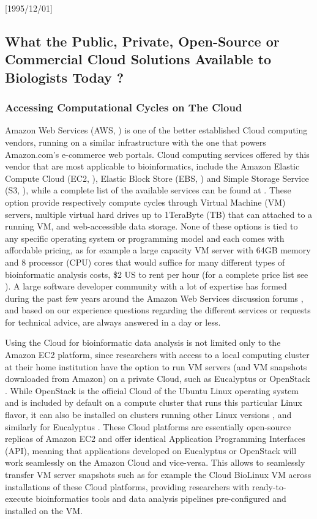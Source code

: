 \NeedsTeXFormat{LaTeX2e}[1995/12/01] \documentclass[10pt]{bmc_article}
\newenvironment{bmcformat}{\begin{raggedright}\baselineskip20pt\sloppy\setboolean{publ}{false}}{\end{raggedright}\baselineskip20pt\sloppy}
\begin{document}
\begin{bmcformat}
\subsection*{What the Public, Private, Open-Source or Commercial Cloud Solutions Available to Biologists Today ?} 

\subsubsection*{Accessing Computational Cycles on The Cloud}

Amazon Web Services (AWS, \cite{aws}) is one of the better established Cloud computing vendors, running on a
similar infrastructure with the one that powers Amazon.com's e-commerce web portals. Cloud computing services 
offered by this vendor that are most applicable to bioinformatics, include the Amazon Elastic Compute Cloud (EC2, \cite{awsec2}),  
Elastic Block Store (EBS, \cite{ebs}) and Simple Storage Service (S3, \cite{s3}), while a complete list of the available 
services can be found at \cite{aws}. These option provide respectively compute cycles through Virtual Machine (VM) 
servers, multiple virtual hard drives up to 1TeraByte (TB) that can attached to a running VM,  and web-accessible 
data storage. None of these options is tied to any specific operating system or programming model and each comes  
with affordable pricing, as for example a large capacity VM server with 64GB memory and 8 processor (CPU) cores 
that would suffice for many different types of bioinformatic analysis costs, \$2 US to rent per hour (for a complete price
 list see \cite{ec2price}). A large software developer community with a lot of expertise has formed during the past few 
 years around the Amazon Web Services discussion forums \cite{awsforums}, and based on our experience questions 
 regarding the  different services or requests for technical advice, are always answered in a day or less. \pb

Using the Cloud for bioinformatic data analysis is not limited only to the Amazon EC2 platform, since researchers
with access to a local computing cluster at their home institution have the option to run VM servers (and VM
snapshots downloaded from Amazon) on a private Cloud, such as Eucalyptus \cite{euca} or OpenStack \cite{openstack}. 
While OpenStack is the official Cloud of the Ubuntu Linux operating system \cite{ubuntucloud} and is included 
by default on a compute cluster that runs this particular Linux flavor, it can also be installed on clusters running other 
Linux versions \cite{openstackother}, and similarly for Eucalyptus \cite{eucalyptusother}. These Cloud platforms 
are essentially open-source replicas of Amazon EC2 and offer identical Application Programming Interfaces (API), 
meaning that applications developed on Eucalyptus or OpenStack will work seamlessly on the Amazon Cloud and vice-versa. 
This allows to seamlessly transfer VM server snapshots such as for example the Cloud BioLinux VM \cite{Krampis2012}  
across installations of these Cloud platforms, providing researchers with ready-to-execute  bioinformatics tools and data 
analysis pipelines pre-configured and installed on the VM. \pb


\end{bmcformat}
\end{document}
